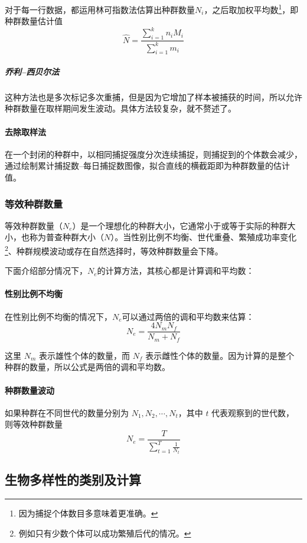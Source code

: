 对于每一行数据，都运用林可指数法估算出种群数量$N_{i}$，之后取加权平均数\footnote{因为捕捉个体数目多意味着更准确。}，即种群数量估计值\[\hat{N}=\frac{\sum\limits_{i=1}^{k}n_{i}M_{i}}{\sum\limits_{i=1}^{k}m_{i}}\]

\subparagraph{乔利--西贝尔法}

这种方法也是多次标记多次重捕，但是因为它增加了样本被捕获的时间，所以允许种群数量在取样期间发生波动。具体方法较复杂，就不赘述了。

\paragraph{去除取样法}

在一个封闭的种群中，以相同捕捉强度分次连续捕捉，则捕捉到的个体数会减少，通过绘制累计捕捉数--每日捕捉数图像，拟合直线的横截距即为种群数量的估计值。

\subsubsection{等效种群数量}

等效种群数量（$N_e$）是一个理想化的种群大小，它通常小于或等于实际的种群大小，也称为普查种群大小（$N$）。当性别比例不均衡、世代重叠、繁殖成功率变化\footnote{例如只有少数个体可以成功繁殖后代的情况。}、种群规模波动或存在自然选择时，等效种群数量会下降。

下面介绍部分情况下，$N_e$的计算方法，其核心都是计算调和平均数：

\paragraph{性别比例不均衡}

在性别比例不均衡的情况下，$N_e$可以通过两倍的调和平均数来估算：
\[N_e = \frac{4N_mN_f}{N_m + N_f}\]

这里 $N_m$ 表示雄性个体的数量，而 $N_f$ 表示雌性个体的数量。因为计算的是整个种群的数量，所以公式是两倍的调和平均数。

\paragraph{种群数量波动}

如果种群在不同世代的数量分别为 $N_1, N_2, \cdots, N_t$，其中 $t$ 代表观察到的世代数，则等效种群数量
\[N_e = \frac{T}{\sum_{t=1}^{T} \frac{1}{N_t}}\]



\subsection{生物多样性的类别及计算}

